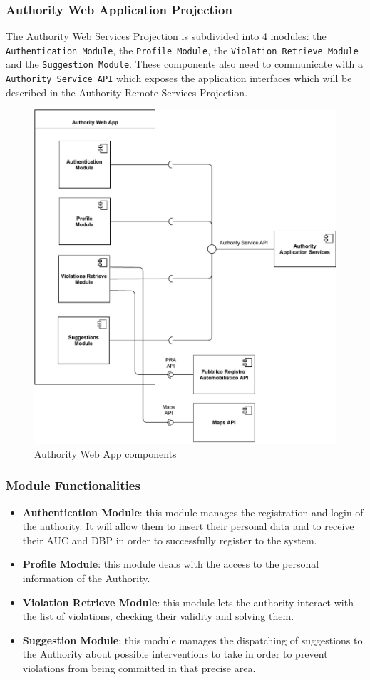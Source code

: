 \documentclass[12pt,a4paper]{article}
\begin{document}
\subsubsection{Authority Web Application Projection}
The Authority Web Services Projection is subdivided into 4 modules: the \texttt{Authentication Module}, the \texttt{Profile Module}, the \texttt{Violation Retrieve Module} and the \texttt{Suggestion Module}. These components also need to communicate with a \texttt{Authority Service API} which exposes the application interfaces which will be described in the Authority Remote Services Projection.
\begin{figure}[H]
		\centering
		\includegraphics[width=1.0\linewidth]{../assets/images/Authority_webapp_projection.pdf}
		\caption{Authority Web App components}
	\end{figure}
\newpage
\subsubsection*{Module Functionalities}
\begin{itemize}
\item \textbf{Authentication Module}: this module manages the registration and login of the authority. It will allow them to insert their personal data and to receive their AUC and DBP in order to successfully register to the system.
\item \textbf{Profile Module}: this module deals with the access to the personal information of the Authority.
\item \textbf{Violation Retrieve Module}: this module lets the authority interact with the list of violations, checking their validity and solving them. 
\item \textbf{Suggestion Module}: this module manages the dispatching of suggestions to the Authority about possible interventions to take in order to prevent violations from being committed in that precise area.
\end{itemize}
\end{document}
